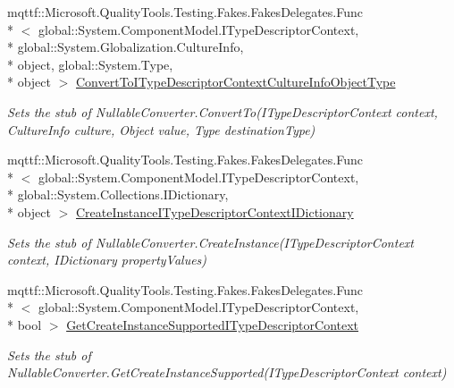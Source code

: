 \begin{DoxyCompactItemize}
mqttf\-::\-Microsoft.\-Quality\-Tools.\-Testing.\-Fakes.\-Fakes\-Delegates.\-Func\\*
$<$ global\-::\-System.\-Component\-Model.\-I\-Type\-Descriptor\-Context, \\*
global\-::\-System.\-Globalization.\-Culture\-Info, \\*
object, global\-::\-System.\-Type, \\*
object $>$ \hyperlink{class_system_1_1_component_model_1_1_fakes_1_1_stub_nullable_converter_ac95c313c37300825d98625af25726654}{Convert\-To\-I\-Type\-Descriptor\-Context\-Culture\-Info\-Object\-Type}
\begin{DoxyCompactList}\small\item\em Sets the stub of Nullable\-Converter.\-Convert\-To(\-I\-Type\-Descriptor\-Context context, Culture\-Info culture, Object value, Type destination\-Type)\end{DoxyCompactList}\item 
mqttf\-::\-Microsoft.\-Quality\-Tools.\-Testing.\-Fakes.\-Fakes\-Delegates.\-Func\\*
$<$ global\-::\-System.\-Component\-Model.\-I\-Type\-Descriptor\-Context, \\*
global\-::\-System.\-Collections.\-I\-Dictionary, \\*
object $>$ \hyperlink{class_system_1_1_component_model_1_1_fakes_1_1_stub_nullable_converter_aa35e2678c4a9aff6962d8e69398b27f3}{Create\-Instance\-I\-Type\-Descriptor\-Context\-I\-Dictionary}
\begin{DoxyCompactList}\small\item\em Sets the stub of Nullable\-Converter.\-Create\-Instance(\-I\-Type\-Descriptor\-Context context, I\-Dictionary property\-Values)\end{DoxyCompactList}\item 
mqttf\-::\-Microsoft.\-Quality\-Tools.\-Testing.\-Fakes.\-Fakes\-Delegates.\-Func\\*
$<$ global\-::\-System.\-Component\-Model.\-I\-Type\-Descriptor\-Context, \\*
bool $>$ \hyperlink{class_system_1_1_component_model_1_1_fakes_1_1_stub_nullable_converter_aa2e8e4e857dff483f263229504574756}{Get\-Create\-Instance\-Supported\-I\-Type\-Descriptor\-Context}
\begin{DoxyCompactList}\small\item\em Sets the stub of Nullable\-Converter.\-Get\-Create\-Instance\-Supported(\-I\-Type\-Descriptor\-Context context)\end{DoxyCompactList}\item 

\end{DoxyCompactItemize}
